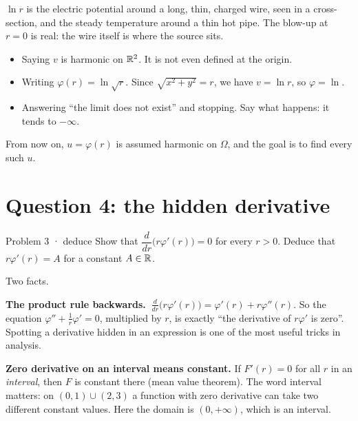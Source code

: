 \begin{reallife}
$\ln r$ is the electric potential around a long, thin, charged wire, seen in a cross-section, and
the steady temperature around a thin hot pipe. The blow-up at $r=0$ is real: the wire itself is
where the source sits.
\end{reallife}

\begin{trap}
\begin{itemize}
  \item Saying $v$ is harmonic on $\mathbb{R}^2$. It is not even defined at the origin.
  \item Writing $\varphi(r)=\ln\sqrt r$. Since $\sqrt{x^2+y^2}=r$, we have $v=\ln r$, so $\varphi=\ln$.
  \item Answering ``the limit does not exist'' and stopping. Say what happens: it tends to $-\infty$.
\end{itemize}
\end{trap}


From now on, $u=\varphi(r)$ is assumed harmonic on $\Omega$, and the goal is to find every such $u$.

\section{Question 4: the hidden derivative}

\begin{question}{Problem 3 \;·\; deduce}
Show that $\dfrac{d}{dr}\big(r\varphi'(r)\big)=0$ for every $r>0$. Deduce that $r\varphi'(r)=A$ for a constant
$A\in\mathbb{R}$.
\end{question}

\begin{lesson}
Two facts.

\textbf{The product rule backwards.} $\ \frac{d}{dr}\big(r\varphi'(r)\big)=\varphi'(r)+r\varphi''(r)$. So
the equation $\varphi''+\frac1r\varphi'=0$, multiplied by $r$, is exactly ``the derivative of $r\varphi'$
is zero''. Spotting a derivative hidden in an expression is one of the most useful tricks in analysis.

\textbf{Zero derivative on an interval means constant.} If $F'(r)=0$ for all $r$ in an
\emph{interval}, then $F$ is constant there (mean value theorem). The word interval matters: on
$(0,1)\cup(2,3)$ a function with zero derivative can take two different constant values. Here the
domain is $(0,+\infty)$, which is an interval.
\end{lesson}

